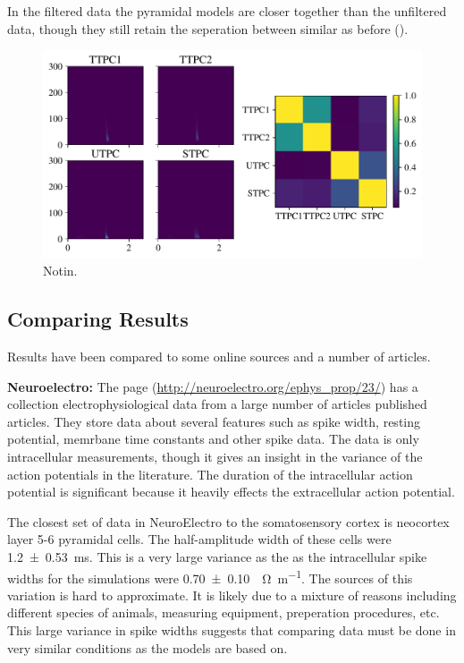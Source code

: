 \documentclass[altfont, fleqn]{uiophd}
\renewcommand{\cref}[1]{{\color{viridis_03}\mycref{#1}}}
\begin{document}
In the filtered data the pyramidal models are closer together than 
the unfiltered data, 
though they still retain the seperation between similar as before
(\cref{fig:4_pyr_overlap_filt}).

\begin{figure}[h]
    \begin{center}
        \includegraphics[width=\linewidth]{images/sec_4/pyr_overlap_filt.pdf}
        \caption{Notin.}
        \label{fig:4_pyr_overlap_filt}
    \end{center}
\end{figure}

\newpage
\subsection{Comparing Results}
Results have been compared to some online sources and a number of articles. 

\noindent
{\bf Neuroelectro:}
The page 
\textcite{_neuroelectro_????}
(\url{http://neuroelectro.org/ephys_prop/23/})
has a collection electrophysiological data 
from a large number of articles published articles.  
They store data about several features such as spike width, resting potential, 
memrbane time constants 
and other spike data. 
The data is only intracellular measurements, 
though it gives an insight in the variance of the 
action potentials in the literature. 
The duration of the intracellular action potential is significant 
because it 
heavily effects the extracellular action potential. %

The closest set of data in NeuroElectro 
to the somatosensory cortex is 
neocortex layer 5-6 pyramidal cells. 
The half-amplitude width of these cells were
\SI[separate-uncertainty = true]{1.2 \pm 0.53}{\milli\second}.
This is a very large variance as the 
as the intracellular spike widths for the simulations 
were
\SI[separate-uncertainty = true]{0.70 \pm 0.10}{\per\ohm\per\metre}.
The sources of this variation is hard to approximate. 
It is likely due to a mixture of reasons including
different species of animals, measuring equipment, 
preperation procedures, etc. 
This large variance in spike widths suggests that
comparing data must be done in very similar conditions
as the models are based on. 
\newline
\end{document}
